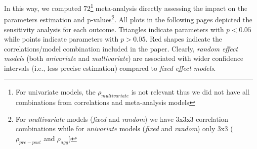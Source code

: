 \documentclass[
]{article}
\begin{document}
In this way, we computed 72\footnote{For univariate models, the \(\rho_{multivariate}\) is not relevant thus we did not have all combinations from correlations and meta-analysis models} meta-analysis directly assessing the impact on the parameters estimation and p-values\footnote{For \emph{multivariate} models (\emph{fixed} and \emph{random}) we have 3x3x3 correlation combinations while for \emph{univariate} models (\emph{fixed} and \emph{random}) only 3x3 (\(\rho_{pre-post}\) and \(\rho_{agg}\))}. All plots in the following pages depicted the sensitivity analysis for each outcome. Triangles indicate parameters with \(p < 0.05\) while points indicate parameters with \(p > 0.05\). Red shapes indicate the correlations/model combination included in the paper. Clearly, \emph{random effect models} (both \emph{univariate} and \emph{multivariate}) are associated with wider confidence intervals (i.e., less precise estimation) compared to \emph{fixed effect models}.
\end{document}
